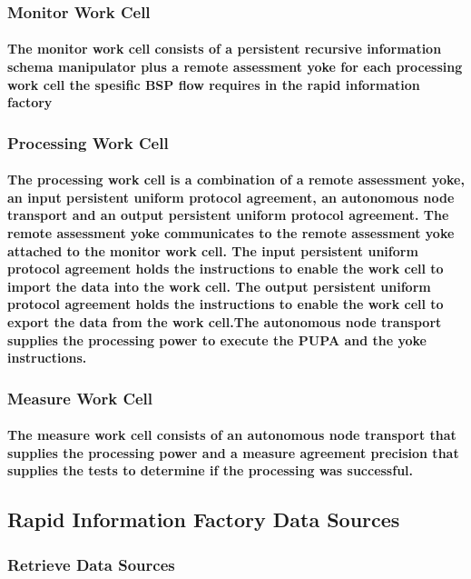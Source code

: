 \documentclass{acm_proc_article-sp}
\begin{document}
\subsubsection{Monitor Work Cell}
\paragraph{The monitor work cell consists of a persistent recursive information schema manipulator plus a remote assessment yoke for each processing work cell the spesific BSP flow requires in the rapid information factory}
\subsubsection{Processing Work Cell}
\paragraph{The processing work cell is a combination of a remote assessment yoke, an input persistent uniform protocol agreement, an autonomous node transport and an output persistent uniform protocol agreement. The remote assessment yoke communicates to the remote assessment yoke attached to the monitor work cell. The input persistent uniform protocol agreement holds the instructions to enable the work cell to import the data into the work cell. The output persistent uniform protocol agreement holds the instructions to enable the work cell to export the data from the work cell.The autonomous node transport supplies the processing power to execute the PUPA and the yoke instructions.}
\subsubsection{Measure Work Cell}
\paragraph{The measure work cell consists of an autonomous node transport that supplies the processing power and a measure agreement precision that supplies the tests to determine if the processing was successful.}
\newpage
\subsection{Rapid Information Factory Data Sources}
\subsubsection{Retrieve Data Sources}
\end{document}
